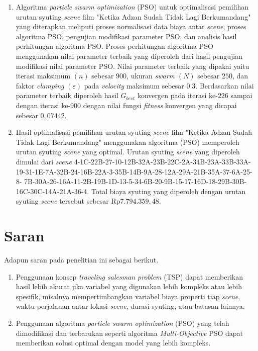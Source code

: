 {\begin{enumerate}[align = left, left = 0cm, nolistsep]
        \item Algoritma \textit{particle swarm optimization} (PSO) untuk optimalisasi pemilihan urutan syuting \textit{scene} film "Ketika Adzan Sudah Tidak Lagi Berkumandang" yang diterapkan meliputi proses normalisasi data biaya antar \textit{scene}, proses algoritma PSO, pengujian modifikasi parameter PSO, dan analisis hasil perhitungan algoritma PSO.
              Proses perhitungan algoritma PSO menggunakan nilai parameter terbaik yang diperoleh dari hasil pengujian modifikasi nilai parameter PSO.
              Nilai parameter terbaik yang dipakai yaitu iterasi maksimum $(n)$ sebesar $900$, ukuran \textit{swarm} $(N)$ sebesar $250$, dan faktor \textit{clamping} $(\varepsilon)$ pada \textit{velocity} maksimum sebesar $0.3$.
              Berdasarkan nilai parameter terbaik diperoleh hasil $G_{best}$ konvergen pada iterasi ke-$226$ sampai dengan iterasi ke-$900$ dengan nilai fungsi \textit{fitness} konvergen yang dicapai sebesar $0,07442$.

        \item Hasil optimalisasi pemilihan urutan syuting \textit{scene} film "Ketika Adzan Sudah Tidak Lagi Berkumandang" menggunakan algoritma (PSO) memperoleh urutan syuting \textit{scene} yang optimal.
              Urutan syuting \textit{scene} yang diperoleh dimulai dari \textit{scene}
              4-1C-22B-27-10-12B-32A-23B-22C-2A-34B-23A-33B-33A-19-31-1E-7A-32B-24-16B-22A-3-35B-14B-9A-28-12A-29A-21B-35A-37-6A-25-8-\newline
              7B-30A-26-16A-11-2B-19B-1D-13-5-34-6B-20-9B-15-17-16D-18-29B-30B-\newline
              16C-30C-14A-21A-36-4. Total biaya syuting yang diperoleh dengan urutan syuting \textit{scene} tersebut sebesar Rp$7.794.359,48$.

    \end{enumerate}

}
\vspace{-3mm}

\section{Saran}
\vspace{-4mm}
{\frenchspacing
    Adapun saran pada penelitian ini sebagai berikut.

    \begin{enumerate}[align = left, left = 0cm, nolistsep]
        \item Penggunaan konsep \textit{traveling salesman problem} (TSP) dapat memberikan hasil lebih akurat jika variabel yang digunakan lebih kompleks atau lebih spesifik, misalnya mempertimbangkan variabel biaya properti tiap \textit{scene}, waktu perjalanan antar lokasi \textit{scene}, durasi syuting, atau batasan lainnya.
        \item Penggunaan algoritma \textit{particle swarm optimization} (PSO) yang telah dimodifikasi dan terbarukan seperti algoritma \textit{Multi-Objective} PSO dapat memberikan solusi optimal dengan model yang lebih kompleks.
    \end{enumerate}
}
\vspace{-3mm}

\pagebreak